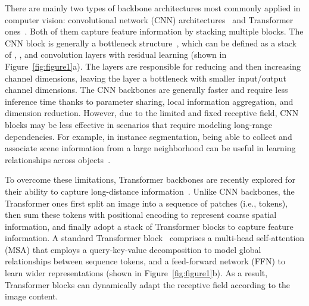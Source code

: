 \documentclass{article}
\begin{document}
There are mainly two types of backbone architectures most commonly applied in computer vision: convolutional network (CNN) architectures~\cite{DBLP:conf/cvpr/HeZRS16,DBLP:journals/corr/abs-2102-00240} and Transformer ones~\cite{DBLP:journals/corr/abs-2010-11929,DBLP:journals/corr/abs-2101-11986}. Both of them capture feature information by stacking multiple blocks. The CNN block is generally a bottleneck structure~\cite{DBLP:conf/cvpr/HeZRS16}, which can be defined as a stack of , , and  convolution layers with residual learning (shown in Figure~\ref{fig:figure1}a). The  layers are responsible for reducing and then increasing channel dimensions, leaving the  layer a bottleneck with smaller input/output channel dimensions. The CNN backbones are generally faster and require less inference time thanks to parameter sharing, local information aggregation, and dimension reduction. However, due to the limited and fixed receptive field, CNN blocks may be less effective in scenarios that require modeling long-range dependencies. For example, in instance segmentation, being able to collect and associate scene information from a large neighborhood can be useful in learning relationships across objects~\cite{DBLP:journals/corr/abs-2101-11605}. 

To overcome these limitations, Transformer backbones are recently explored for their ability to capture long-distance information~\cite{DBLP:journals/corr/abs-2010-11929,DBLP:journals/corr/abs-2101-11986,DBLP:journals/corr/abs-2012-12877,DBLP:journals/corr/abs-2103-14030}. Unlike CNN backbones, the Transformer ones first split an image into a sequence of patches (i.e., tokens), then sum these tokens with positional encoding to represent coarse spatial information, and finally adopt a stack of Transformer blocks to capture feature information. A standard Transformer block~\cite{DBLP:conf/nips/VaswaniSPUJGKP17} comprises a multi-head self-attention (MSA) that employs a query-key-value decomposition to model global relationships between sequence tokens, and a feed-forward network (FFN) to learn wider representations (shown in Figure~\ref{fig:figure1}b). As a result, Transformer blocks can dynamically adapt the receptive field according to the image content.
\end{document}
